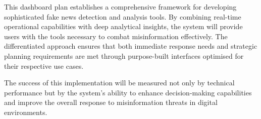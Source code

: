 \documentclass[11pt,a4paper]{article}
\begin{document}
This dashboard plan establishes a comprehensive framework for developing sophisticated fake news detection and analysis tools. By combining real-time operational capabilities with deep analytical insights, the system will provide users with the tools necessary to combat misinformation effectively. The differentiated approach ensures that both immediate response needs and strategic planning requirements are met through purpose-built interfaces optimised for their respective use cases.

The success of this implementation will be measured not only by technical performance but by the system's ability to enhance decision-making capabilities and improve the overall response to misinformation threats in digital environments.
\end{document}
